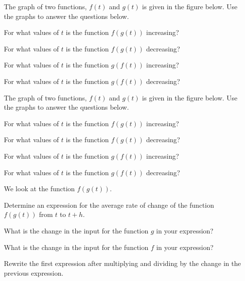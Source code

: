 \begin{problem}
\item The graph of two functions, $f(t)$ and $g(t)$ is given in the
  figure below. Use the graphs to answer the questions below.

  \scalebox{0.75}{}

  \begin{subproblem}
  \item For what values of $t$ is the function $f(g(t))$ increasing?
    \vfill
  \item For what values of $t$ is the function $f(g(t))$ decreasing?
    \vfill
  \item For what values of $t$ is the function $g(f(t))$ increasing?
    \vfill
  \item For what values of $t$ is the function $g(f(t))$ decreasing?
    \vfill
  \end{subproblem}

  \clearpage

\item The graph of two functions, $f(t)$ and $g(t)$ is given in the
  figure below. Use the graphs to answer the questions below.

  \scalebox{0.75}{}

  \begin{subproblem}
  \item For what values of $t$ is the function $f(g(t))$ increasing?
    \vfill
  \item For what values of $t$ is the function $f(g(t))$ decreasing?
    \vfill
  \item For what values of $t$ is the function $g(f(t))$ increasing?
    \vfill
  \item For what values of $t$ is the function $g(f(t))$ decreasing?
    \vfill
  \end{subproblem}

  \clearpage

\item We look at the function $f(g(t))$.
  \begin{subproblem}
  \item Determine an expression for the average rate of change of the
    function $f(g(t))$ from $t$ to $t+h$.
    \vfill
  \item What is the change in the input for the function $g$ in your
    expression? 
    \vspace{2em}
  \item What is the change in the input for the function $f$ in your
    expression? 
    \vspace{2em}
  \item Rewrite the first expression after multiplying and dividing by
    the change in the previous expression.
    \vfill
  \end{subproblem}


\end{problem}
